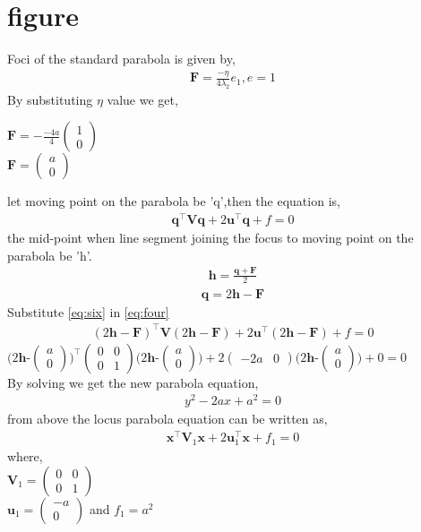 \documentclass[journal,12pt,twocolumn]{IEEEtran}
\newcommand{\myvec}[1]{\ensuremath{\begin{pmatrix}#1\end{pmatrix}}}
\let\vec\mathbf
\begin{document}
\section{\textbf{figure}}
Foci of the standard parabola is given by,\\
\begin{align}
\label{eq:three}
\vec{F}=\frac{-\eta}{4\lambda_2}e_1 , e=1
\end{align} 
By substituting $\eta$ value we get,\\
\begin{center}
$\vec{F}=-\frac{-4a}{4}\myvec{1\\0}$\\
$\vec{F}=\myvec{a\\0}$
\end{center}
let moving point on the parabola be 'q',then the equation is,
\begin{align}
\label{eq:four}
\vec{q}^\top\vec{Vq}+2\vec{u}^\top\vec{q}+f=0
\end{align}
the mid-point when line segment joining the focus to moving point on the parabola be 'h'.
\begin{align}
\label{eq:five}
\vec{h}=\frac{\vec{q+F}}{2}
\end{align}
\begin{align}
\label{eq:six}
\vec{q}=2\vec{h}-\vec{F}
\end{align}
Substitute \eqref{eq:six} in \eqref{eq:four}\\
\begin{align}
\label{eq:seven}
(2\vec{h}-\vec{F})^\top\vec{V}(2\vec{h}-\vec{F})+2\vec{u}^\top(2\vec{h}-\vec{F})+f=0
\end{align}
$(2\vec{h}$-$\myvec{a\\0})^\top\myvec{0&0\\0&1}(2\vec{h}$-$\myvec{a\\0})+2\myvec{-2a&0}(2\vec{h}$-$\myvec{a\\0})+0=0$\\
By solving we get the new parabola equation,\\
\begin{align}
\label{eq:ei}
y^2-2ax+a^2=0
\end{align}
from above the locus parabola equation can be written as, \\
\begin{align}
\label{eq:ni}
\vec{x}^\top\vec{V}_{1}\vec{x}+2\vec{u}_{1}^\top\vec{x}+f_1=0
\end{align} 
where,\\
$\vec{V}_{1}=\myvec{0&0 \\0&1}$\\ $\vec{u}_{1}=\myvec{-a\\0}$ and $f_1=a^2$ \\
\end{document}
